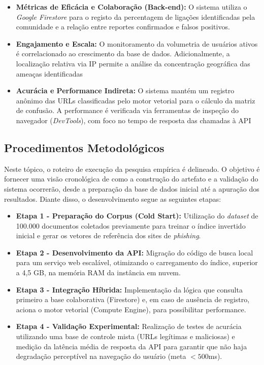 \documentclass[a4paper,12pt]{article}
\begin{document}
\begin{itemize}
   \item \textbf{Métricas de Eficácia e Colaboração (Back-end):} O sistema utiliza o \textit{Google Firestore} para o registo da percentagem de ligações identificadas pela comunidade e a relação entre reportes confirmados e falsos positivos.
    \item \textbf{Engajamento e Escala:} O monitoramento da volumetria de usuários ativos é correlacionado ao crescimento da base de dados. Adicionalmente, a localização relativa via IP permite a análise da concentração geográfica das ameaças identificadas
    \item \textbf{Acurácia e Performance Indireta:} O sistema mantém um registro anônimo das URLs classificadas pelo motor vetorial para o cálculo da matriz de confusão. A performance é verificada via ferramentas de inspeção do navegador (\textit{DevTools}), com foco no tempo de resposta das chamadas à API
\end{itemize}

\subsection{Procedimentos Metodológicos}

Neste tópico, o roteiro de execução da pesquisa empírica é delineado. O objetivo é fornecer uma visão cronológica de como a construção do artefato e a validação do sistema ocorrerão, desde a preparação da base de dados inicial até a apuração dos resultados. Diante disso, o desenvolvimento segue as seguintes etapas:

\begin{itemize}
    \item \textbf{Etapa 1 - Preparação do Corpus (Cold Start):} Utilização do \textit{dataset} de 100.000 documentos coletados previamente para treinar o índice invertido inicial e gerar os vetores de referência dos sites de \textit{phishing}.
    \item \textbf{Etapa 2 - Desenvolvimento da API:} Migração do código de busca local para um serviço web escalável, otimizando o carregamento do índice, superior a 4,5 GB,  na memória RAM da instância em nuvem.
    \item \textbf{Etapa 3 - Integração Híbrida:} Implementação da lógica que consulta primeiro a base colaborativa (Firestore) e, em caso de ausência de registro, aciona o motor vetorial (Compute Engine), para possibilitar performance.
    \item \textbf{Etapa 4 - Validação Experimental:} Realização de testes de acurácia utilizando uma base de controle mista (URLs legítimas e maliciosas) e medição da latência média de resposta da API para garantir que não haja degradação perceptível na navegação do usuário (meta $< 500$ms).
\end{itemize}
\end{document}

